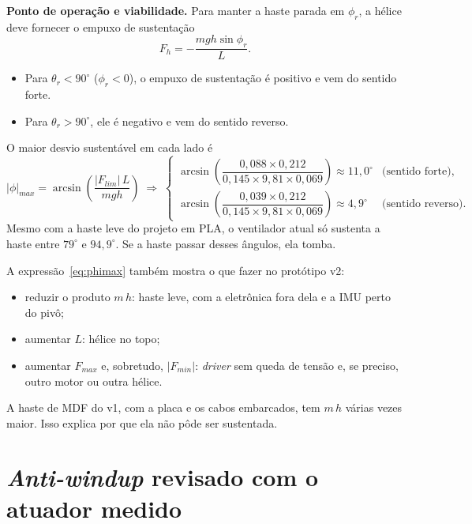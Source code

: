 \documentclass[a4paper,11pt]{article}
\begin{document}
\textbf{Ponto de operação e viabilidade.} Para manter a haste parada em $\phi_r$, a hélice deve
fornecer o empuxo de sustentação
\begin{equation}
  F_h=-\frac{m g h \sin\phi_r}{L}.
  \label{eq:Fh}
\end{equation}
\begin{itemize}
  \item Para $\theta_r<90^\circ$ ($\phi_r<0$), o empuxo de sustentação é positivo e vem do sentido
    forte.
  \item Para $\theta_r>90^\circ$, ele é negativo e vem do sentido reverso.
\end{itemize}
O maior desvio sustentável em cada lado é
\begin{equation}
  |\phi|_{max}=\arcsin\!\left(\frac{|F_{lim}|\,L}{m g h}\right)\;\Rightarrow\;
  \begin{cases}
    \arcsin\!\left(\dfrac{0{,}088\times0{,}212}{0{,}145\times9{,}81\times0{,}069}\right)\approx 11{,}0^\circ & \text{(sentido forte)},\\[10pt]
    \arcsin\!\left(\dfrac{0{,}039\times0{,}212}{0{,}145\times9{,}81\times0{,}069}\right)\approx 4{,}9^\circ & \text{(sentido reverso)}.
  \end{cases}
  \label{eq:phimax}
\end{equation}
Mesmo com a haste leve do projeto em PLA, o ventilador atual só sustenta a haste entre $79^\circ$ e
$94{,}9^\circ$.
Se a haste passar desses ângulos, ela tomba.

A expressão~\eqref{eq:phimax} também mostra o que fazer no protótipo v2:
\begin{itemize}
  \item reduzir o produto $m\,h$: haste leve, com a eletrônica fora dela e a IMU perto do pivô;
  \item aumentar $L$: hélice no topo;
  \item aumentar $F_{max}$ e, sobretudo, $|F_{min}|$: \textit{driver} sem queda de tensão e, se
    preciso, outro motor ou outra hélice.
\end{itemize}
A haste de MDF do v1, com a placa e os cabos embarcados, tem $m\,h$ várias vezes maior. Isso explica
por que ela não pôde ser sustentada.

\section{\textit{Anti-windup} revisado com o atuador medido}
\label{sec:aw}
\end{document}
